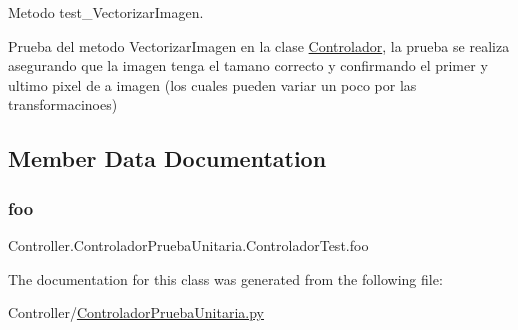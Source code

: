 Metodo test\+\_\+\+Vectorizar\+Imagen. 

Prueba del metodo Vectorizar\+Imagen en la clase \hyperlink{namespace_controller_1_1_controlador}{Controlador}, la prueba se realiza asegurando que la imagen tenga el tamano correcto y confirmando el primer y ultimo pixel de a imagen (los cuales pueden variar un poco por las transformacinoes) 

\subsection{Member Data Documentation}
\mbox{\label{class_controller_1_1_controlador_prueba_unitaria_1_1_controlador_test_a2f176dc83cda878c82e90b5eed2c321a}} 
\subsubsection{\texorpdfstring{foo}{foo}}
{\footnotesize\ttfamily Controller.\+Controlador\+Prueba\+Unitaria.\+Controlador\+Test.\+foo}



The documentation for this class was generated from the following file\+:\begin{DoxyCompactItemize}
\item 
Controller/\hyperlink{_controlador_prueba_unitaria_8py}{Controlador\+Prueba\+Unitaria.\+py}\end{DoxyCompactItemize}
